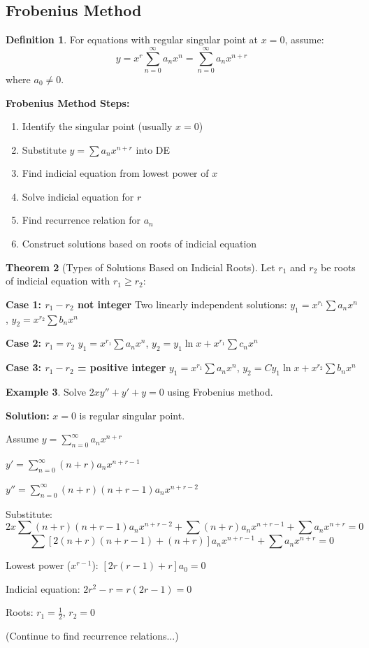 \documentclass[12pt,a4paper]{article}
\theoremstyle{definition}
\newtheorem{theorem}{Theorem}[section]
\newtheorem{definition}[theorem]{Definition}
\newtheorem{example}[theorem]{Example}
\begin{document}
\subsection{Frobenius Method}

\begin{definition}
For equations with regular singular point at $x = 0$, assume:
\[
y = x^r\sum_{n=0}^{\infty} a_n x^n = \sum_{n=0}^{\infty} a_n x^{n+r}
\]
where $a_0 \neq 0$.
\end{definition}

\begin{importantbox}
\textbf{Frobenius Method Steps:}
\begin{enumerate}
    \item Identify the singular point (usually $x = 0$)
    \item Substitute $y = \sum a_n x^{n+r}$ into DE
    \item Find indicial equation from lowest power of $x$
    \item Solve indicial equation for $r$
    \item Find recurrence relation for $a_n$
    \item Construct solutions based on roots of indicial equation
\end{enumerate}
\end{importantbox}

\begin{theorem}[Types of Solutions Based on Indicial Roots]
Let $r_1$ and $r_2$ be roots of indicial equation with $r_1 \geq r_2$:

\textbf{Case 1: $r_1 - r_2$ not integer}
Two linearly independent solutions: $y_1 = x^{r_1}\sum a_n x^n$, $y_2 = x^{r_2}\sum b_n x^n$

\textbf{Case 2: $r_1 = r_2$}
$y_1 = x^{r_1}\sum a_n x^n$, $y_2 = y_1\ln x + x^{r_1}\sum c_n x^n$

\textbf{Case 3: $r_1 - r_2$ = positive integer}
$y_1 = x^{r_1}\sum a_n x^n$, $y_2 = Cy_1\ln x + x^{r_2}\sum b_n x^n$
\end{theorem}

\begin{example}
Solve $2xy'' + y' + y = 0$ using Frobenius method.

\textbf{Solution:}
$x = 0$ is regular singular point.

Assume $y = \sum_{n=0}^{\infty} a_n x^{n+r}$

$y' = \sum_{n=0}^{\infty} (n+r)a_n x^{n+r-1}$

$y'' = \sum_{n=0}^{\infty} (n+r)(n+r-1)a_n x^{n+r-2}$

Substitute:
\[
2x\sum(n+r)(n+r-1)a_n x^{n+r-2} + \sum(n+r)a_n x^{n+r-1} + \sum a_n x^{n+r} = 0
\]
\[
\sum[2(n+r)(n+r-1) + (n+r)]a_n x^{n+r-1} + \sum a_n x^{n+r} = 0
\]

Lowest power ($x^{r-1}$): $[2r(r-1) + r]a_0 = 0$

Indicial equation: $2r^2 - r = r(2r - 1) = 0$

Roots: $r_1 = \frac{1}{2}$, $r_2 = 0$

(Continue to find recurrence relations...)
\end{example}
\end{document}
